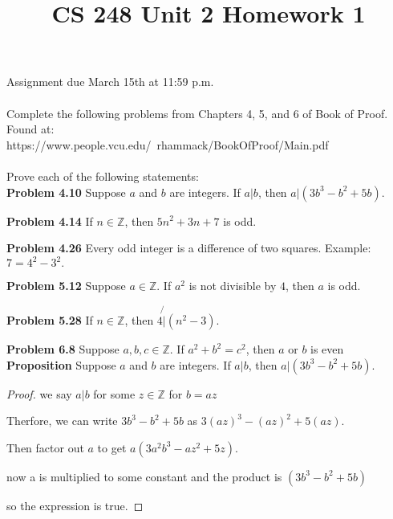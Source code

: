 \documentclass[12pt]{article}
\title{CS 248 Unit 2 Homework 1}
\def\Z{\mathbb Z}
\begin{document}
Assignment due March 15th at 11:59 p.m. \\ \\
Complete the following problems from Chapters 4, 5, and 6 of Book of Proof. Found at: \\ https://www.people.vcu.edu/~rhammack/BookOfProof/Main.pdf \\ \\
Prove each of the following statements: \\ 

{\bf Problem 4.10} Suppose $a$ and $b$ are integers. If $a|b$, then $a|(3b^3-b^2+5b).$

{\bf Problem 4.14} If $n \in \Z$, then $5n^2+3n+7$ is odd.

{\bf Problem 4.26} Every odd integer is a difference of two squares. Example: $7 = 4^2-3^2.$

{\bf Problem 5.12} Suppose $a \in \Z$. If $a^2$ is not divisible by $4$, then $a$ is odd.

{\bf Problem 5.28} If $n \in \Z$, then $4 \not{|}  (n^2-3).$ 

{\bf Problem 6.8} Suppose $a,b,c \in \Z$. If $a^2+b^2=c^2$, then $a$ or $b$ is even \\


{\bf Proposition} Suppose $a$ and $b$ are integers. If $a|b$, then $a|(3b^3-b^2+5b).$

\begin{proof}

    we say $a|b$ for some $z\in\Z$ for $b=az$

    Therfore, we can write $3b^3-b^2+5b$ as $3(az)^3-(az)^2+5(az)$.

    Then factor out $a$ to get $a(3a^2b^3-az^2+5z)$.

    now a is multiplied to some constant and the product is $(3b^3-b^2+5b)$ 
    
    so the expression is true.

\end{proof}
\end{document}
